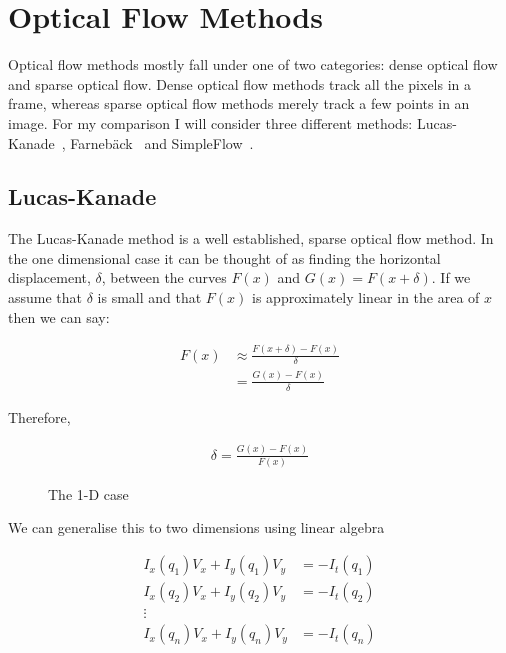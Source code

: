 \documentclass[a4paper,10pt]{article}
\begin{document}
    
  \section{Optical Flow Methods}
    Optical flow methods mostly fall under one of two categories: dense optical flow and sparse optical flow. Dense optical flow methods track all the pixels in a frame, whereas sparse optical flow methods merely track a few points in an image. For my comparison I will consider three different methods: Lucas-Kanade~\cite{lucas-kanade}, Farnebäck~\cite{farneback} and SimpleFlow~\cite{simpleflow}.
    
    \subsection{Lucas-Kanade}
      The Lucas-Kanade method is a well established, sparse optical flow method. In the one dimensional case it can be thought of as finding the horizontal displacement, $\delta$, between the curves $F(x)$ and $G(x)=F(x+\delta)$. If we assume that $\delta$ is small and that $F(x)$ is approximately linear in the area of $x$ then we can say:
      
      \begin{align*}
        F(x) &\approx \frac{F(x+\delta)-F(x)}{\delta} \\
             &= \frac{G(x)-F(x)}{\delta} 
      \end{align*}
      
      Therefore,
      
      \begin{align*}
        \delta = \frac{G(x)-F(x)}{F(x)}
      \end{align*}
      
      \begin{figure}[h]
        \centering
        \caption{The 1-D case}
        \label{fig:lucas-kanade}
      \end{figure}
      
      We can generalise this to two dimensions using linear algebra~\cite{lucas}
      
      \begin{align*}
        I_x(q_1) V_x + I_y (q_1) V_y &= -I_t(q_1) \\
        I_x(q_2) V_x + I_y (q_2) V_y &= -I_t(q_2) \\
        \vdots \\
        I_x(q_n) V_x + I_y (q_n) V_y &= -I_t(q_n)
      \end{align*}
      
\end{document}
